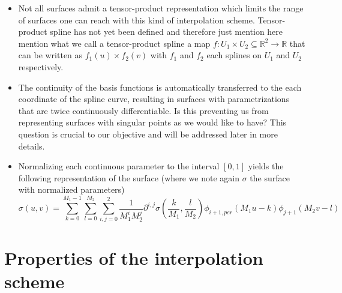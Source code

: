 \documentclass[a4paper, 11pt]{article}
\begin{document}
\begin{remark}{3}
  \begin{itemize}
    \item  Not all surfaces admit a tensor-product representation which limits the range of surfaces one can reach with 
      this kind of interpolation scheme. Tensor-product spline has not yet been defined and therefore just mention here 
      mention what we call a tensor-product spline a map $f: U_1\times U_2 \subseteq \mathbb{R}^2 \to \mathbb{R}$ that 
      can be written as $f_1(u) \times f_2(v)$ with $f_1$ and $f_2$ each splines on $U_1$ and $U_2$ respectively.
    \item The continuity of the basis functions is automatically transferred to the each coordinate of the spline curve, 
      resulting in surfaces with parametrizations that are twice continuously differentiable. Is this preventing us from 
      representing surfaces with singular points as we would like to have? This question is crucial to our objective and 
      will be addressed later in more details.
    \item Normalizing each continuous parameter to the interval $[0,1]$ yields the following representation of the 
      surface (where we note again $\sigma$ the surface with normalized parameters)
      \begin{equation}
        \sigma(u,v) = \sum_{k=0}^{M_1-1} \sum_{l=0}^{M_2} \sum_{i,j = 0}^2 \frac{1}{M_1^i M_2^j} \partial^{i,j} 
        \sigma(\frac{k}{M_1}, \frac{l}{M_2}) \phi_{i+1, per}(M_1u-k) \phi_{j+1}(M_2v-l)
      \end{equation}
  \end{itemize}
\end{remark}

\section{Properties of the interpolation scheme}
\end{document}
